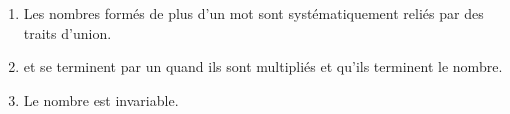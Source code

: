 \begin{enumerate}
    \item Les nombres formés de plus d'un mot sont systématiquement reliés
    par des traits d'union.
    \item {} et  se terminent par un
     quand ils sont multipliés et qu'ils terminent le nombre.
    \item Le nombre  est invariable.
\end{enumerate}